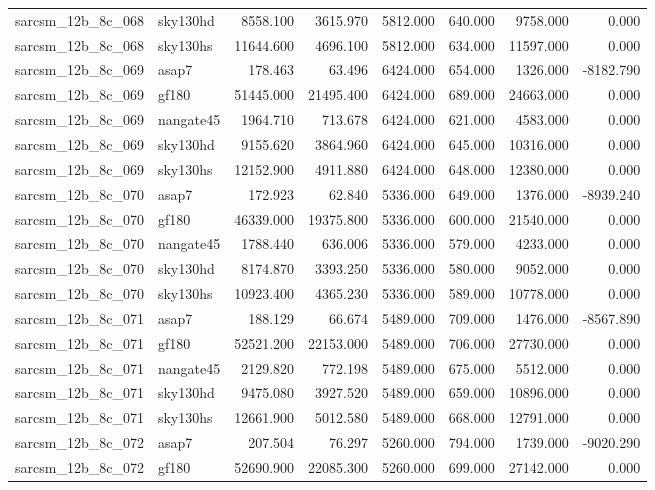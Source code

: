 \begin{tabular}{llrrrrrr}
sarcsm\_12b\_8c\_068 & sky130hd & 8558.100 & 3615.970 & 5812.000 & 640.000 & 9758.000 & 0.000 \\
sarcsm\_12b\_8c\_068 & sky130hs & 11644.600 & 4696.100 & 5812.000 & 634.000 & 11597.000 & 0.000 \\
sarcsm\_12b\_8c\_069 & asap7 & 178.463 & 63.496 & 6424.000 & 654.000 & 1326.000 & -8182.790 \\
sarcsm\_12b\_8c\_069 & gf180 & 51445.000 & 21495.400 & 6424.000 & 689.000 & 24663.000 & 0.000 \\
sarcsm\_12b\_8c\_069 & nangate45 & 1964.710 & 713.678 & 6424.000 & 621.000 & 4583.000 & 0.000 \\
sarcsm\_12b\_8c\_069 & sky130hd & 9155.620 & 3864.960 & 6424.000 & 645.000 & 10316.000 & 0.000 \\
sarcsm\_12b\_8c\_069 & sky130hs & 12152.900 & 4911.880 & 6424.000 & 648.000 & 12380.000 & 0.000 \\
sarcsm\_12b\_8c\_070 & asap7 & 172.923 & 62.840 & 5336.000 & 649.000 & 1376.000 & -8939.240 \\
sarcsm\_12b\_8c\_070 & gf180 & 46339.000 & 19375.800 & 5336.000 & 600.000 & 21540.000 & 0.000 \\
sarcsm\_12b\_8c\_070 & nangate45 & 1788.440 & 636.006 & 5336.000 & 579.000 & 4233.000 & 0.000 \\
sarcsm\_12b\_8c\_070 & sky130hd & 8174.870 & 3393.250 & 5336.000 & 580.000 & 9052.000 & 0.000 \\
sarcsm\_12b\_8c\_070 & sky130hs & 10923.400 & 4365.230 & 5336.000 & 589.000 & 10778.000 & 0.000 \\
sarcsm\_12b\_8c\_071 & asap7 & 188.129 & 66.674 & 5489.000 & 709.000 & 1476.000 & -8567.890 \\
sarcsm\_12b\_8c\_071 & gf180 & 52521.200 & 22153.000 & 5489.000 & 706.000 & 27730.000 & 0.000 \\
sarcsm\_12b\_8c\_071 & nangate45 & 2129.820 & 772.198 & 5489.000 & 675.000 & 5512.000 & 0.000 \\
sarcsm\_12b\_8c\_071 & sky130hd & 9475.080 & 3927.520 & 5489.000 & 659.000 & 10896.000 & 0.000 \\
sarcsm\_12b\_8c\_071 & sky130hs & 12661.900 & 5012.580 & 5489.000 & 668.000 & 12791.000 & 0.000 \\
sarcsm\_12b\_8c\_072 & asap7 & 207.504 & 76.297 & 5260.000 & 794.000 & 1739.000 & -9020.290 \\
sarcsm\_12b\_8c\_072 & gf180 & 52690.900 & 22085.300 & 5260.000 & 699.000 & 27142.000 & 0.000 \\

\end{tabular}
